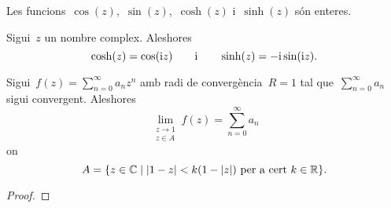\documentclass[../Apunts.tex]{subfiles}
\begin{document}
	\begin{observation}
		Les funcions~\(\cos(z)\),~\(\sin(z)\),~\(\cosh(z)\)
		i~\(\sinh(z)\) són enteres.
	\end{observation}
	\begin{observation}
		Sigui~\(z\) un nombre complex.
		Aleshores
		\begin{equation*}
			\cosh(z)=\cos(\mathrm{i} z)\qquad\text{i}\qquad\sinh(z)=-\mathrm{i}\sin(\mathrm{i} z).
		\end{equation*}
	\end{observation}
	\begin{theorem}
		\label{thm:Teorema d'Abel per sèries de potències complexes}
		Sigui~\(f(z)=\sum_{n=0}^{\infty}a_{n}z^{n}\) amb radi de
		convergència~\(R=1\) tal que~\(\sum_{n=0}^{\infty}a_{n}\) sigui convergent.
		Aleshores
		\[\lim_{\substack{z\to1\\z\in A}}f(z)=\sum_{n=0}^{\infty}a_{n}\]
		on
		\begin{equation}
			\label{eq:1:thm:Teorema d'Abel per sèries de potències complexes}
			A=\{z\in\CC\mid\abs{1-z}<k(1-\modul{z})\text{ per a cert }k\in\RR\}.
		\end{equation}
	\end{theorem}
	\begin{proof}
%		
	\end{proof}
\end{document}
